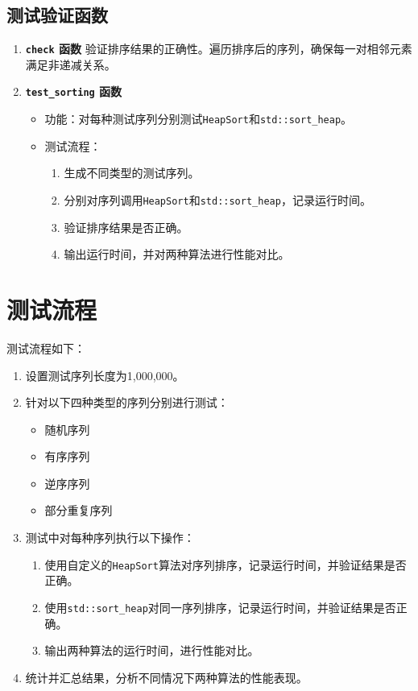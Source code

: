 \documentclass{ctexart}
\begin{document}
\subsection{测试验证函数}

\begin{enumerate}
    \item \textbf{\texttt{check} 函数}  
    验证排序结果的正确性。遍历排序后的序列，确保每一对相邻元素满足非递减关系。

    \item \textbf{\texttt{test\_sorting} 函数}  
    \begin{itemize}
        \item 功能：对每种测试序列分别测试\texttt{HeapSort}和\texttt{std::sort\_heap}。
        \item 测试流程：
        \begin{enumerate}
            \item 生成不同类型的测试序列。
            \item 分别对序列调用\texttt{HeapSort}和\texttt{std::sort\_heap}，记录运行时间。
            \item 验证排序结果是否正确。
            \item 输出运行时间，并对两种算法进行性能对比。
        \end{enumerate}
    \end{itemize}
\end{enumerate}

\section{测试流程}

测试流程如下：

\begin{enumerate}
    \item 设置测试序列长度为1,000,000。
    \item 针对以下四种类型的序列分别进行测试：
    \begin{itemize}
        \item 随机序列
        \item 有序序列
        \item 逆序序列
        \item 部分重复序列
    \end{itemize}
    \item 测试中对每种序列执行以下操作：
    \begin{enumerate}
        \item 使用自定义的\texttt{HeapSort}算法对序列排序，记录运行时间，并验证结果是否正确。
        \item 使用\texttt{std::sort\_heap}对同一序列排序，记录运行时间，并验证结果是否正确。
        \item 输出两种算法的运行时间，进行性能对比。
    \end{enumerate}
    \item 统计并汇总结果，分析不同情况下两种算法的性能表现。
\end{enumerate}
\end{document}

